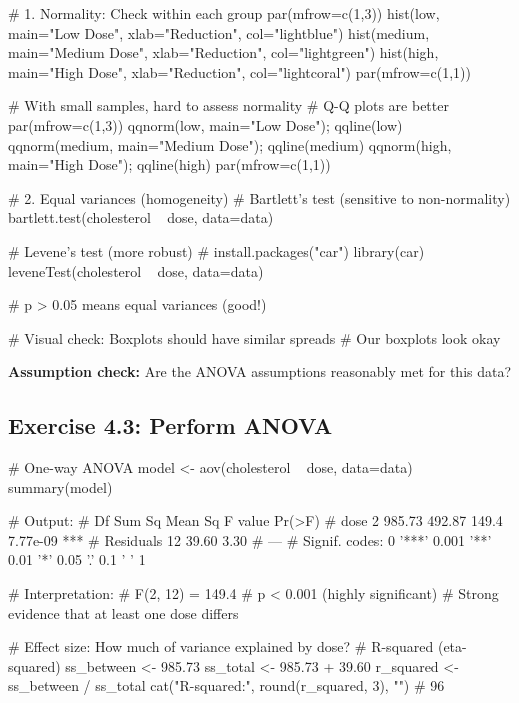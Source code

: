 \documentclass[11pt]{article}
\begin{document}
\begin{rcode}
# 1. Normality: Check within each group
par(mfrow=c(1,3))
hist(low, main="Low Dose", xlab="Reduction", col="lightblue")
hist(medium, main="Medium Dose", xlab="Reduction", col="lightgreen")
hist(high, main="High Dose", xlab="Reduction", col="lightcoral")
par(mfrow=c(1,1))

# With small samples, hard to assess normality
# Q-Q plots are better
par(mfrow=c(1,3))
qqnorm(low, main="Low Dose"); qqline(low)
qqnorm(medium, main="Medium Dose"); qqline(medium)
qqnorm(high, main="High Dose"); qqline(high)
par(mfrow=c(1,1))

# 2. Equal variances (homogeneity)
# Bartlett's test (sensitive to non-normality)
bartlett.test(cholesterol ~ dose, data=data)

# Levene's test (more robust)
# install.packages("car")
library(car)
leveneTest(cholesterol ~ dose, data=data)

# p > 0.05 means equal variances (good!)

# Visual check: Boxplots should have similar spreads
# Our boxplots look okay
\end{rcode}

\textbf{Assumption check:} Are the ANOVA assumptions reasonably met for this data?

\vspace{2cm}

\subsection{Exercise 4.3: Perform ANOVA}

\begin{rcode}
# One-way ANOVA
model <- aov(cholesterol ~ dose, data=data)
summary(model)

# Output:
#             Df Sum Sq Mean Sq F value   Pr(>F)
# dose         2 985.73  492.87   149.4 7.77e-09 ***
# Residuals   12  39.60    3.30
# ---
# Signif. codes:  0 '***' 0.001 '**' 0.01 '*' 0.05 '.' 0.1 ' ' 1

# Interpretation:
# F(2, 12) = 149.4
# p < 0.001 (highly significant)
# Strong evidence that at least one dose differs

# Effect size: How much of variance explained by dose?
# R-squared (eta-squared)
ss_between <- 985.73
ss_total <- 985.73 + 39.60
r_squared <- ss_between / ss_total
cat("R-squared:", round(r_squared, 3), "\n")
# 96%
\end{rcode}
\end{document}
